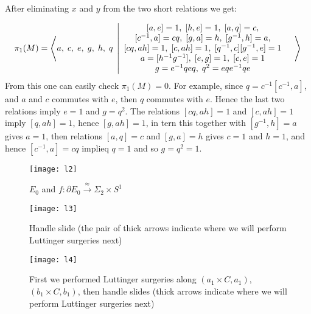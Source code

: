 \documentclass[11pt]{amsart}
\begin{document}
 After eliminating $x$ and $y$ from the two short relations we get:  
 
   \begin{equation*}
 \pi_{1}(M) = \left\langle a,\; c,\; e,\; g,\; h,\; q \; \left| 
\begin{array}{cc}
[a,e]=1,  \;  [h,e]=1,  \;  [a,q]=c, & \\
 $$[c^{-1},a]=cq, \; [g,a]=h, \; [g^{-1},h]=a,
  & \\
$$[cq,ah]=1,\; [c,ah]=1,\;  [q^{-1},c][g^{-1},e]=1&\\
a=[h^{-1}g^{-1}], \; [e,g]=1,\; [c,e]=1&\\
g=e^{-1}qeq,\; q^{2}=eqe^{-1}qe\\
\end{array}  \right\rangle \right.
\end{equation*}
From this one can easily check $ \pi_{1}(M) =0$. For example, since $q=c^{-1}[c^{-1},a]$, and $a$ and $c$ commutes with $e$, then $q$ commutes with $e$. Hence the last two relations imply $e=1$ and $g=q^2$.  The relations $[cq,ah]=1$ and $[c,ah]=1$ imply $[q,ah]=1$, hence $[g,ah]=1$, in tern this together with $ [g^{-1},h]=a$ gives $a=1$, then relations $[a,q]=c$  and $[g,a]=h$ gives $c=1$ and $h=1$, and hence $[c^{-1},a]=cq$  implieq $q=1$ and so $g=q^2=1$.

 
    \begin{figure}[ht]  \begin{center}  
\texttt{[image: l2]}   
\caption{$E_{0}$ and  $f: \partial E_{0}\stackrel{\approx}{\longrightarrow} \Sigma_{2}\times S^1$} 
\end{center}
\end{figure} 

    \begin{figure}[ht]  \begin{center}  
\texttt{[image: l3]}   
\caption{Handle slide (the pair of thick  arrows  indicate where we will perform Luttinger surgeries next)} 
\end{center}
\end{figure} 

   \begin{figure}[ht]  \begin{center}  
\texttt{[image: l4]}   
\caption{First we performed Luttinger surgeries along $( a_1\times C, a_1)$, $( b_1\times C, b_1)$, then handle slides (thick arrows indicate where we will perform Luttinger surgeries next)} 
\end{center}
\end{figure} 
\end{document}
